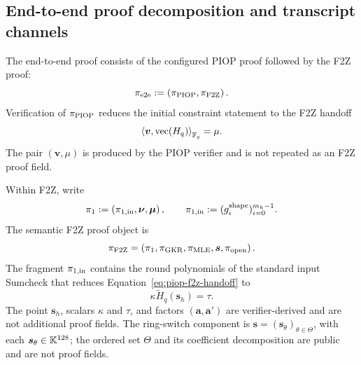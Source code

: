 \newcommand{\Pmsg}[1]{\(\xrightarrow{\;\scriptstyle #1\;}\)}
\newcommand{\Vmsg}[1]{\(\xleftarrow{\;\scriptstyle #1\;}\)}
\newcommand{\Pturn}[1]{#1 & & \\[1pt]}
\newcommand{\Vturn}[1]{& & #1 \\[1pt]}
\newcommand{\Psend}[1]{& \Pmsg{#1} & \\[-1pt]}
\newcommand{\Vsend}[1]{& \Vmsg{#1} & \\[-1pt]}

\newenvironment{pvstep}[3][2.0in]
  {\Needspace{#1}%
   \par\addvspace{0.45\baselineskip}%
   \refstepcounter{clgstep}%
   \clgmarkstart
   \noindent
   {\normalsize\bfseries\sffamily\textcolor{clgtitlec}%
     {P\theclgstep/V\theclgstep.}~#2}%
   \nopagebreak\par\vspace{0.08\baselineskip}%
   #3%
   \clgboard%
   \nopagebreak}
  {\clgreserve\par\addvspace{0.12\baselineskip}}

\subsection{End-to-end proof decomposition and transcript channels}
\label{sec:transcript-channels}

The end-to-end proof consists of the configured PIOP proof followed by the
F2Z proof:
\begin{equation}
 \pi_{\rm e2e}:=\left(
   \pi_{\rm PIOP},
   \pi_{\rm F2Z}
 \right).
 \label{eq:end-to-end-proof-object}
\end{equation}
Verification of $\pi_{\rm PIOP}$ reduces the initial constraint statement to
the F2Z handoff
\begin{equation}
 \left\langle\bm v,\operatorname{vec}(H_q)\right\rangle_{\mathbb F_q}=\mu.
 \label{eq:piop-f2z-handoff}
\end{equation}
The pair $(\bm v,\mu)$ is produced by the PIOP verifier and is not repeated as
an F2Z proof field.

Within F2Z, write
\begin{equation}
 \pi_1:=\left(
   \pi_{1,{\rm in}},
   \bm\nu,\bm\mu
 \right),
 \qquad
 \pi_{1,{\rm in}}:=(g_i^{\rm shape})_{i=0}^{m_h-1}.
 \label{eq:pi1-proof-object}
\end{equation}
The semantic F2Z proof object is
\begin{equation}
 \pi_{\mathrm{F2Z}}
 =\left(
   \pi_1,
   \pi_{\rm GKR},\pi_{\rm MLE},
   \bm s,
   \pi_{\rm open}
 \right).
 \label{eq:proof-object}
\end{equation}
The fragment $\pi_{1,{\rm in}}$ contains the round polynomials of the standard
input Sumcheck that reduces Equation~\eqref{eq:piop-f2z-handoff} to
\begin{equation}
 \kappa\widetilde H_q(\bm s_h)=\tau.
 \label{eq:input-sumcheck-output}
\end{equation}
The point $\bm s_h$, scalars $\kappa$ and $\tau$, and factors
$(\bm a,\bm a')$ are verifier-derived and are not additional proof fields.
The ring-switch component is
$\bm s=(\bm s_\theta)_{\theta\in\Theta}$, with each
$\bm s_\theta\in\mathbb K^{128}$; the ordered set $\Theta$ and its coefficient
decomposition are public and are not proof fields.

